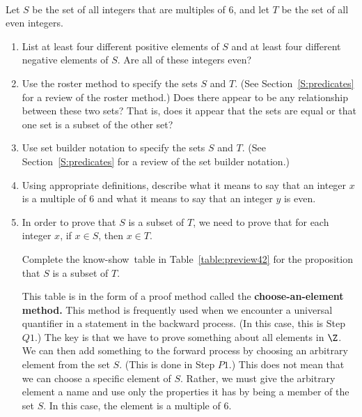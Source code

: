 \begin{previewactivity} \label{PA:working2sets} \hfill \\
Let  $S$  be the set of all integers that are multiples of  6, and let  $T$  be the set of all even integers.

\begin{enumerate}
\item List at least  four  different positive elements of  $S$  and at least  four  different negative elements of  $S$.  Are all of these integers even?

\item Use the roster method to specify the sets  $S$  and  $T$.  (See Section~\ref{S:predicates} for a review of the roster method.)  Does there appear to be any relationship between these two sets?  That is, does it appear that the sets are equal or that one set is a subset of the other set?

\item Use set builder notation to specify the sets  $S$  and  $T$.  (See Section~\ref{S:predicates} for a review of the set builder notation.)

\item Using appropriate definitions, describe what it means to say that an integer  $x$  is a multiple of  6 and what it means to say that an integer  $y$  is even.  



%

\item In order to prove that $S$ is a subset of $T$, we need to prove that for each integer $x$, if $x \in S$, then $x \in T$. 

Complete the know-show~table 
in Table~\ref{table:preview42} 
for the proposition that  $S$  is a subset of   $T$.

This table is in the form of a proof method called the \textbf{choose-an-element method.}
%
  This method is frequently used when we encounter a universal quantifier in a statement in the backward process.  (In this case, this is Step $Q1$.)  The key is that we have to prove something about all elements in  $\Z$.  We can then add something to the forward process by choosing an arbitrary element from the set 
$S$.  (This is done in Step $P1$.)  This does not mean that we can choose a specific element of $S$.  Rather, we must give the arbitrary element a name and use only the properties it has by being a member of the set 
$S$.  In this case, the element is a multiple of 6.  


\end{enumerate}
\end{previewactivity}
